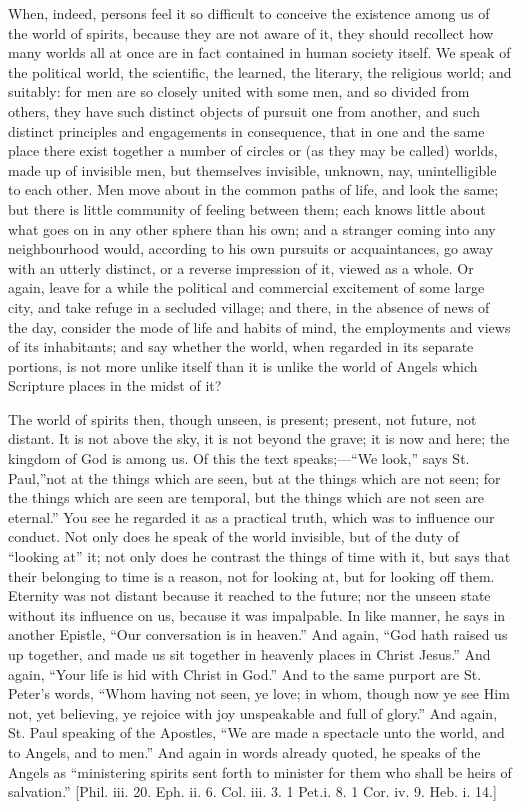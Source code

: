 When, indeed, persons feel it so difficult to conceive the
existence among us of the world of spirits, because they are not aware
of it, they should recollect how many worlds all at once are in fact
contained in human society itself. We speak of the political world,
the scientific, the learned, the literary, the religious world; and
suitably: for men are so closely united with some men, and so divided
from others, they have such distinct objects of pursuit one from
another, and such distinct principles and engagements in consequence,
that in one and the same place there exist together a number of
circles or (as they may be called) worlds, made up of invisible men,
but themselves invisible, unknown, nay, unintelligible to each other.
Men move about in the common paths of life, and look the same; but
there is little community of feeling between them; each knows little
about what goes on in any other sphere than his own; and a stranger
coming into any neighbourhood would, according to his own pursuits or
acquaintances, go away with an utterly distinct, or a reverse
impression of it, viewed as a whole. Or again, leave for a while the
political and commercial excitement of some large city, and take
refuge in a secluded village; and there, in the absence of news of the
day, consider the mode of life and habits of mind, the employments and
views of its inhabitants; and say whether the world, when regarded in
its separate portions, is not more unlike itself than it is unlike the
world of Angels which Scripture places in the midst of it?

The world of spirits then, though unseen, is present; present, not
future, not distant. It is not above the sky, it is not beyond the
grave; it is now and here; the kingdom of God is among us. Of this the
text speaks;—``We look,'' says St. Paul,\emph{}''not at
the things which are seen, but at the things which are not seen; for
the things which are seen are temporal, but the things which are not
seen are eternal.'' You see he regarded it as a practical truth,
which was to influence our conduct. Not only does he speak of the
world invisible, but of the duty of ``looking at'' it; not
only does he contrast the things of time with it, but says that their
belonging to time is a reason, not for looking at, but for looking off
them. Eternity was not distant because it reached to the future; nor
the unseen state without its influence on us, because it was
impalpable. In like manner, he says in another Epistle, ``Our
conversation is in heaven.'' And again, ``God hath raised us
up together, and made us sit together in heavenly places in Christ
Jesus.'' And again, ``Your life is hid with Christ in
God.'' And to the same purport are St. Peter's words, ``Whom
having not seen, ye love; in whom, though now ye see Him not, yet
believing, ye rejoice with joy unspeakable and full of glory.''
And again, St. Paul speaking of the Apostles, ``We are made a
spectacle unto the world, and to Angels, and to men.'' And again
in words already quoted, he speaks of the Angels as ``ministering
spirits sent forth to minister for them who shall be heirs of
salvation.'' [Phil. iii. 20. Eph. ii. 6. Col. iii. 3. 1 Pet\emph{.}i.
8. 1 Cor. iv. 9. Heb. i. 14.]

